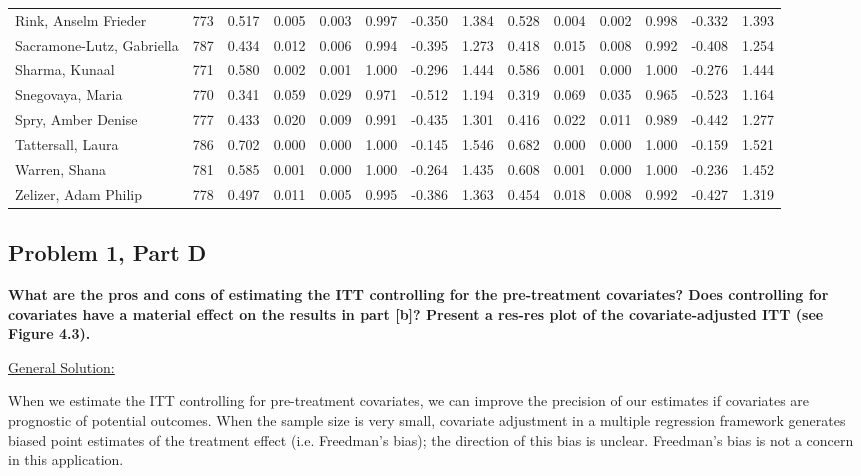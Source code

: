 \documentclass[11pt,notitlepage]{article}
\begin{document}
\begin{table}[h!]
\begin{center}
\begin{tabular}{lrrrrrrr|rrrrrr}
  Rink, Anselm Frieder & 773 & 0.517 & 0.005 & 0.003 & 0.997 & -0.350 & 1.384 & 0.528 & 0.004 & 0.002 & 0.998 & -0.332 & 1.393 \\ 
  Sacramone-Lutz, Gabriella & 787 & 0.434 & 0.012 & 0.006 & 0.994 & -0.395 & 1.273 & 0.418 & 0.015 & 0.008 & 0.992 & -0.408 & 1.254 \\ 
  Sharma, Kunaal & 771 & 0.580 & 0.002 & 0.001 & 1.000 & -0.296 & 1.444 & 0.586 & 0.001 & 0.000 & 1.000 & -0.276 & 1.444 \\ 
  Snegovaya, Maria & 770 & 0.341 & 0.059 & 0.029 & 0.971 & -0.512 & 1.194 & 0.319 & 0.069 & 0.035 & 0.965 & -0.523 & 1.164 \\ 
  Spry, Amber Denise & 777 & 0.433 & 0.020 & 0.009 & 0.991 & -0.435 & 1.301 & 0.416 & 0.022 & 0.011 & 0.989 & -0.442 & 1.277 \\ 
  Tattersall, Laura & 786 & 0.702 & 0.000 & 0.000 & 1.000 & -0.145 & 1.546 & 0.682 & 0.000 & 0.000 & 1.000 & -0.159 & 1.521 \\ 
  Warren, Shana & 781 & 0.585 & 0.001 & 0.000 & 1.000 & -0.264 & 1.435 & 0.608 & 0.001 & 0.000 & 1.000 & -0.236 & 1.452 \\ 
  Zelizer, Adam Philip & 778 & 0.497 & 0.011 & 0.005 & 0.995 & -0.386 & 1.363 & 0.454 & 0.018 & 0.008 & 0.992 & -0.427 & 1.319 \\ 
   \hline
\end{tabular}
\end{center}
\end{table}


\clearpage


\subsection{Problem 1, Part D} {\bf What are the pros and cons of estimating the ITT controlling for the pre-treatment covariates?  Does controlling for covariates have a material effect on the results in part [b]?  Present a res-res plot of the covariate-adjusted ITT (see Figure 4.3).}



\vspace{1cm}

\underline{{\sc General Solution:}}

When we estimate the ITT controlling for pre-treatment covariates, we can improve the precision of our estimates if covariates are prognostic of potential outcomes. When the sample size is very small, covariate adjustment in a multiple regression framework generates biased point estimates of the treatment effect (i.e. Freedman's bias); the direction of this bias is unclear. Freedman's bias is not a concern in this application.\\
\end{document}

